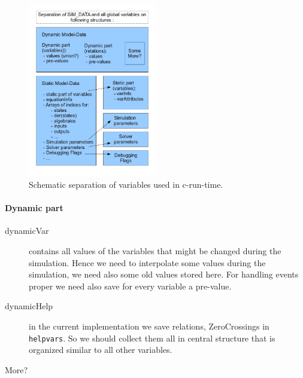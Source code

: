 \begin{figure}[htb]
\begin{center}
  \includegraphics[width=0.5\textwidth]{SimulationRuntime/c/img/newSimDATA.png}
  \caption{Schematic separation of variables used in c-run-time.}
  \label{fig:seperatedVariables}
\end{center}
\end{figure}

\paragraph{Dynamic part}
\begin{description}
\item[dynamicVar] contains all values of the variables
that might be changed during the simulation. Hence we need to interpolate some
values during the simulation, we need also some old values stored here. For
handling events proper we need also save for every variable a pre-value.
\item[dynamicHelp] in the current implementation we save relations,
ZeroCrossings in \verb+helpvars+. So we should collect them all in central
structure that is organized similar to all other variables.
\item[More?]
\end{description}

